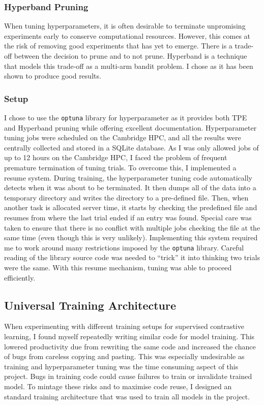 \documentclass[12pt,a4paper,twoside,openany]{report}
\begin{document}
\subsubsection{Hyperband Pruning}
When tuning hyperparameters, it is often desirable to terminate unpromising experiments early to conserve computational resources. However, this comes at the risk of removing good experiments that has yet to emerge. There is a trade-off between the decision to prune and to not prune. Hyperband \cite{li_hyperband_2018} is a technique that models this trade-off as a multi-arm bandit problem. I chose as it has been shown to produce good results.

\subsubsection{Setup}
I chose to use the \verb|optuna| library for hyperparameter as it provides both TPE and Hyperband pruning while offering excellent documentation. 
Hyperparameter tuning jobs were scheduled on the Cambridge HPC, and all the results were centrally collected and stored in a SQLite database. 
As I was only allowed jobs of up to 12 hours on the Cambridge HPC, I faced the problem of frequent premature termination of tuning trials. To overcome this, I implemented a resume system. During training, the hyperparameter tuning code automatically detects when it was about to be terminated. It then dumps all of the data into a temporary directory and writes the directory to a pre-defined file. Then, when another task is allocated server time, it starts by checking the predefined file and resumes from where the last trial ended if an entry was found. Special care was taken to ensure that there is no conflict with multiple jobs checking the file at the same time (even though this is very unlikely). Implementing this system required me to work around many restrictions imposed by the \verb|optuna| library. Careful reading of the library source code was needed to ``trick'' it into thinking two trials were the same. With this resume mechanism, tuning was able to proceed efficiently.

\subsection{Universal Training Architecture}
When experimenting with different training setups for supervised contrastive learning, I found myself repeatedly writing similar code for model training. This lowered productivity due from rewriting the same code and increased the chance of bugs from careless copying and pasting. This was especially undesirable as training and hyperparameter tuning was the time consuming aspect of this project. Bugs in training code could cause failures to train or invalidate trained model. To mintage these risks and to maximise code reuse, I designed an standard training architecture that was used to train all models in the project.
\end{document}
